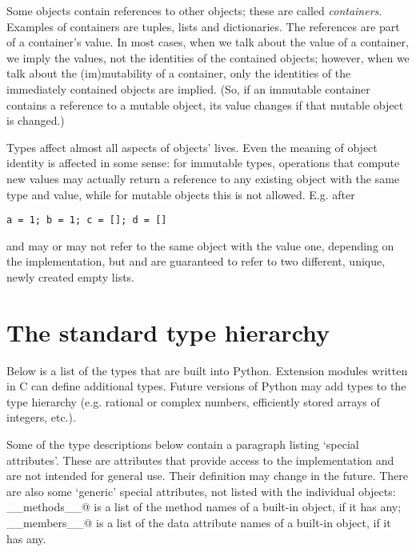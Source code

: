 Some objects contain references to other objects; these are called
{\em containers}.  Examples of containers are tuples, lists and
dictionaries.  The references are part of a container's value.  In
most cases, when we talk about the value of a container, we imply the
values, not the identities of the contained objects; however, when we
talk about the (im)mutability of a container, only the identities of
the immediately contained objects are implied.  (So, if an immutable
container contains a reference to a mutable object, its value changes
if that mutable object is changed.)

Types affect almost all aspects of objects' lives.  Even the meaning
of object identity is affected in some sense: for immutable types,
operations that compute new values may actually return a reference to
any existing object with the same type and value, while for mutable
objects this is not allowed.  E.g. after

\begin{verbatim}
a = 1; b = 1; c = []; d = []
\end{verbatim}

\verb@a@ and \verb@b@ may or may not refer to the same object with the
value one, depending on the implementation, but \verb@c@ and \verb@d@
are guaranteed to refer to two different, unique, newly created empty
lists.

\section{The standard type hierarchy} \label{types}

Below is a list of the types that are built into Python.  Extension
modules written in C can define additional types.  Future versions of
Python may add types to the type hierarchy (e.g. rational or complex
numbers, efficiently stored arrays of integers, etc.).

Some of the type descriptions below contain a paragraph listing
`special attributes'.  These are attributes that provide access to the
implementation and are not intended for general use.  Their definition
may change in the future.  There are also some `generic' special
attributes, not listed with the individual objects: \verb@__methods__@
is a list of the method names of a built-in object, if it has any;
\verb@__members__@ is a list of the data attribute names of a built-in
object, if it has any.

